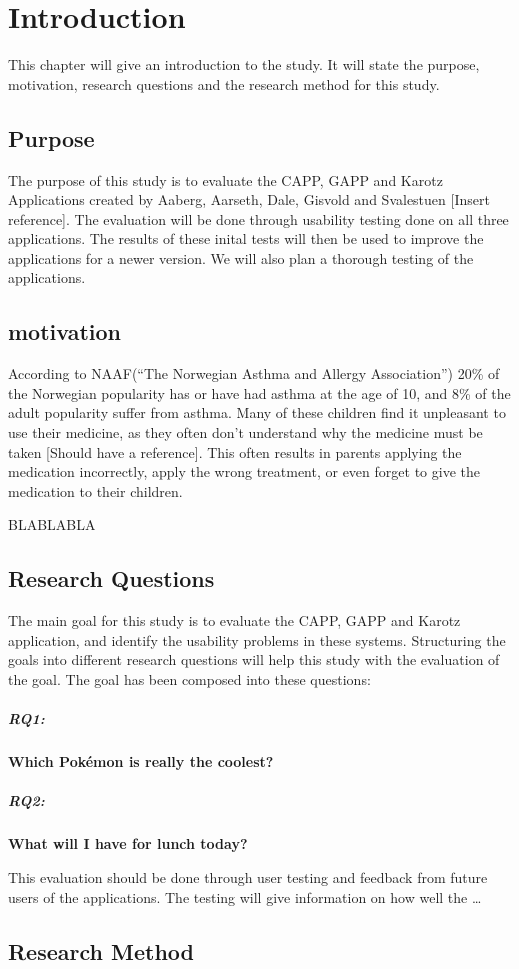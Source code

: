 \chapter{Introduction}
\label{introduction}

This chapter will give an introduction to the study. It will state the purpose, motivation, research questions and the research method for this study. 

\section{Purpose}
\label{purpose}
The purpose of this study is to evaluate the CAPP, GAPP and Karotz Applications created by Aaberg, Aarseth, Dale, Gisvold and Svalestuen [Insert reference].
The evaluation will be done through usability testing done on all three applications. The results of these inital tests will then be used to improve the applications for a newer version. 
We will also plan a thorough testing of the applications.


\section{motivation}
According to NAAF(``The Norwegian Asthma and Allergy Association'') 20\% of the Norwegian popularity has or have had asthma at the age of 10, and 8\% of the adult popularity suffer from asthma. Many of these children find it unpleasant to use their medicine, as they often don't understand why the medicine must be taken [Should have a reference]. This often results in parents applying the medication incorrectly, apply the wrong treatment, or even forget to give the medication to their children. 

BLABLABLA


\section{Research Questions}
\label{reseachquestions}
The main goal for this study is to evaluate the CAPP, GAPP and Karotz application, and identify the usability problems in these systems. Structuring the goals into different research questions will help this study with the evaluation of the goal. The goal has been composed into these questions:

\paragraph{RQ1:}
\textbf{Which Pokémon is really the coolest?}

\paragraph{RQ2:}
\textbf{What will I have for lunch today?}

This evaluation should be done through user testing and feedback from future users of the applications. The testing will give information on how well the 
\ldots

\section{Research Method}
\label{researchmethod}


